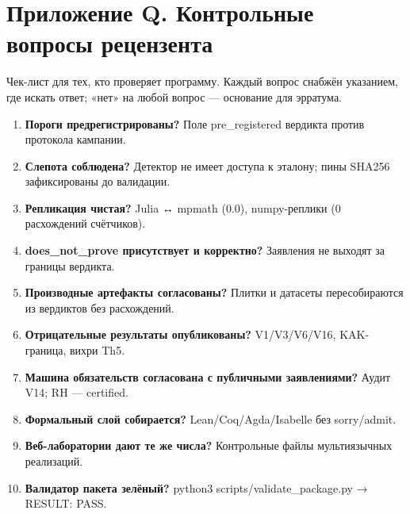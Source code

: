 \documentclass[11pt,a4paper]{article}
\begin{document}
\section{Приложение Q. Контрольные вопросы рецензента}

Чек-лист для тех, кто проверяет программу. Каждый вопрос снабжён указанием, где искать ответ; «нет» на любой вопрос — основание для эрратума.

\begin{enumerate}
  \item \textbf{Пороги предрегистрированы?} Поле pre\_registered вердикта против протокола кампании.
  \item \textbf{Слепота соблюдена?} Детектор не имеет доступа к эталону; пины SHA256 зафиксированы до валидации.
  \item \textbf{Репликация чистая?} Julia ↔ mpmath (0.0), numpy-реплики (0 расхождений счётчиков).
  \item \textbf{does\_not\_prove присутствует и корректно?} Заявления не выходят за границы вердикта.
  \item \textbf{Производные артефакты согласованы?} Плитки и датасеты пересобираются из вердиктов без расхождений.
  \item \textbf{Отрицательные результаты опубликованы?} V1/V3/V6/V16, KAK-граница, вихри Th5.
  \item \textbf{Машина обязательств согласована с публичными заявлениями?} Аудит V14; RH — certified.
  \item \textbf{Формальный слой собирается?} Lean/Coq/Agda/Isabelle без sorry/admit.
  \item \textbf{Веб-лаборатории дают те же числа?} Контрольные файлы мультиязычных реализаций.
  \item \textbf{Валидатор пакета зелёный?} python3 scripts/validate\_package.py → RESULT: PASS.
\end{enumerate}
\end{document}
